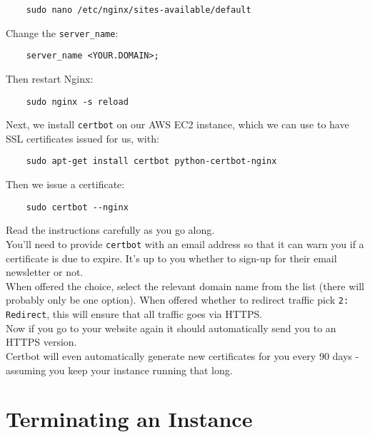 \begin{verbatim}
    sudo nano /etc/nginx/sites-available/default
\end{verbatim}

Change the \texttt{server\_name}:

\begin{verbatim}
    server_name <YOUR.DOMAIN>;
\end{verbatim}

Then restart Nginx:

\begin{verbatim}
    sudo nginx -s reload
\end{verbatim}

Next, we install \texttt{certbot} on our AWS EC2 instance, which we can use to have SSL certificates issued for us, with:

\begin{verbatim}
    sudo apt-get install certbot python-certbot-nginx
\end{verbatim}

Then we issue a certificate:

\begin{verbatim}
    sudo certbot --nginx
\end{verbatim}

Read the instructions carefully as you go along.
\\

You'll need to provide \texttt{certbot} with an email address so that it can warn you if a certificate is due to expire. It's up to you whether to sign-up for their email newsletter or not.
\\

When offered the choice, select the relevant domain name from the list (there will probably only be one option). When offered whether to redirect traffic pick \texttt{2: Redirect}, this will ensure that all traffic goes via HTTPS.
\\

Now if you go to your website again it should automatically send you to an HTTPS version.
\\

Certbot will even automatically generate new certificates for you every 90 days - assuming you keep your instance running that long.


\section{Terminating an Instance}

